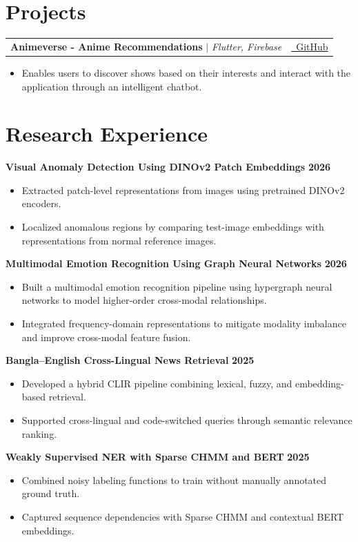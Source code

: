 \documentclass{resume}
\makeatletter
\newcommand{\projectheading}[4]{%
  \begin{tabularx}{\linewidth}{@{}X@{\hspace{1em}}r@{}}
    \textbf{#1 - #2} $|$ \emph{#3} & {\small #4}
  \end{tabularx}\vspace{-4pt}
}
\renewenvironment{rSection}[1]{
  \section{#1}
  \begin{list}{}{
      \setlength{\leftmargin}{0.2em}
  }
  \item[]
}{
  \end{list}
  \vspace{0pt}
}
\makeatother
\begin{document}
\begin{rSection}{Projects}
\projectheading{Animeverse}{Anime Recommendations}{Flutter, Firebase}{%
  \href{https://github.com/shufanshahi/animeverse}{\faGithub\ GitHub}%
}
\begin{itemize}
  \item Enables users to discover shows based on their interests and interact with the application through an intelligent chatbot.
\end{itemize}
\end{rSection}

\begin{rSection}{Research Experience}
\textbf{Visual Anomaly Detection Using DINOv2 Patch Embeddings} \hfill \textbf{2026}
\begin{itemize}
  \item Extracted patch-level representations from images using pretrained DINOv2 encoders.
  \item Localized anomalous regions by comparing test-image embeddings with representations from normal reference images.
\end{itemize}

\textbf{Multimodal Emotion Recognition Using Graph Neural Networks} \hfill \textbf{2026}
\begin{itemize}
  \item Built a multimodal emotion recognition pipeline using hypergraph neural networks to model higher-order cross-modal relationships.
  \item Integrated frequency-domain representations to mitigate modality imbalance and improve cross-modal feature fusion.
\end{itemize}

\textbf{Bangla--English Cross-Lingual News Retrieval} \hfill \textbf{2025}
\begin{itemize}
  \item Developed a hybrid CLIR pipeline combining lexical, fuzzy, and embedding-based retrieval.
  \item Supported cross-lingual and code-switched queries through semantic relevance ranking.
\end{itemize}

\textbf{Weakly Supervised NER with Sparse CHMM and BERT} \hfill \textbf{2025}
\begin{itemize}
  \item Combined noisy labeling functions to train without manually annotated ground truth.
  \item Captured sequence dependencies with Sparse CHMM and contextual BERT embeddings.
\end{itemize}
\end{rSection}
\end{document}
